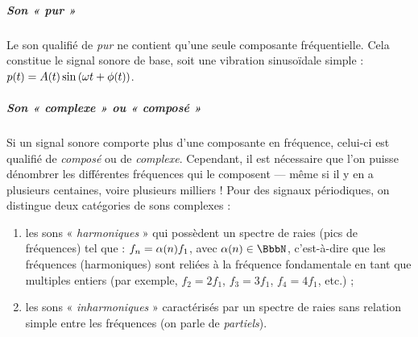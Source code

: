 \subparagraph{Son « \emph{pur} »} Le son qualifié de \emph{pur} ne contient qu'une seule composante fréquentielle. Cela constitue le signal sonore de base, soit une vibration sinusoïdale simple : $p\mbox{\small (} t \mbox{\small )} = A\mbox{\small (} t \mbox{\small )}\sin\mbox{\small (} \omega t + \phi\mbox{\small (} t \mbox{\small )} \mbox{\small )}$.

\subparagraph{Son « complexe » ou « composé »} Si un signal sonore comporte plus d'une composante en fréquence, celui-ci est qualifié de \emph{composé} ou de \emph{complexe}. Cependant, il est nécessaire que l'on puisse dénombrer les différentes fréquences qui le composent --- même si il y en a plusieurs centaines, voire plusieurs milliers ! Pour des signaux périodiques, on distingue deux catégories de sons complexes :
\begin{enumerate}
\item les sons « \emph{harmoniques} » qui possèdent un spectre de raies (pics de fréquences) tel que : $f_{n} = \alpha\mbox{\small (} n \mbox{\small )} f_{1}$, avec $\alpha\var{n} \in \BbbN$, c'est-à-dire que les fréquences (harmoniques) sont reliées à la fréquence fondamentale en tant que multiples entiers (par exemple, $f_{2}=2f_{1}$, $f_{3}=3f_{1}$, $f_{4}=4f_{1}$, etc.) ;
\item les sons « \emph{inharmoniques} » caractérisés par un spectre de raies sans relation simple entre les fréquences (on parle de \emph{partiels}). 
\end{enumerate}

